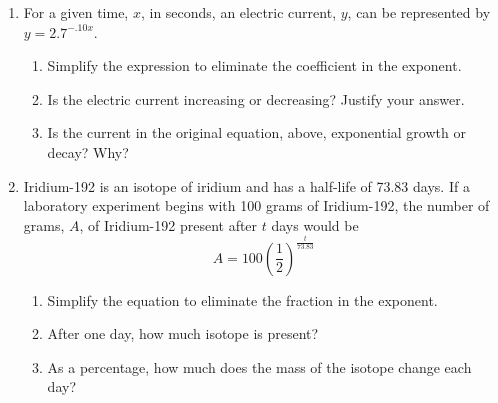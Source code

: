 \documentclass[12pt, oneside]{article}
\begin{document}
\begin{enumerate}
\item For a given time, $x$, in seconds, an electric current, $y$, can be represented by $y = 2.7^{-.10x}$. 
\begin{enumerate}
    \item Simplify the expression to eliminate the coefficient in the exponent.\\[40pt]
    \item Is the electric current increasing or decreasing? Justify your answer.\\[70pt]
    \item Is the current in the original equation, above, exponential growth or decay? Why?\\[70pt]
\end{enumerate}

\newpage

\item Iridium-192 is an isotope of iridium and has a half-life of 73.83 days. If a laboratory experiment begins with 100 grams of Iridium-192, the number of grams, $A$, of Iridium-192 present after $t$ days would be 
\[A=100 \left( \frac{1}{2} \right)^\frac{t}{73.83}\]

\begin{enumerate}
    \item Simplify the equation to eliminate the fraction in the exponent.\\[30pt]
    \item After one day, how much isotope is present?\\[30pt]
    \item As a percentage, how much does the mass of the isotope change each day?\\[30pt]
\end{enumerate}


\end{enumerate}
\end{document}
